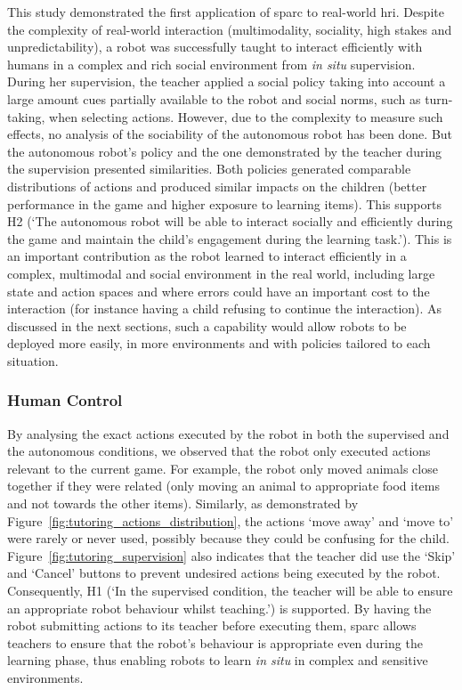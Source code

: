 This study demonstrated the first application of \gls{sparc} to real-world \gls{hri}. Despite the complexity of real-world interaction (multimodality, sociality, high stakes and unpredictability), a robot was successfully taught to interact efficiently with humans in a complex and rich social environment from \textit{in situ} supervision. During her supervision, the teacher applied a social policy taking into account a large amount cues partially available to the robot and social norms, such as turn-taking, when selecting actions. However, due to the complexity to measure such effects, no analysis of the sociability of the autonomous robot has been done. But the autonomous robot's policy and the one demonstrated by the teacher during the supervision presented similarities. Both policies generated comparable distributions of actions and produced similar impacts on the children (better performance in the game and higher exposure to learning items). 
This supports H2 (`The autonomous robot will be able to interact socially and efficiently during the game and maintain the child's engagement during the learning task.'). 
This is an important contribution as the robot learned to interact efficiently in a complex, multimodal and social environment in the real world, including large state and action spaces and where errors could have an important cost to the interaction (for instance having a child refusing to continue the interaction). As discussed in the next sections, such a capability would allow robots to be deployed more easily, in more environments and with policies tailored to each situation.

\subsubsection{Human Control} \label{sec:tuto_control}

By analysing the exact actions executed by the robot in both the supervised and the autonomous conditions, we observed that the robot only executed actions relevant to the current game. For example, the robot only moved animals close together if they were related (only moving an animal to appropriate food items and not towards the other items). Similarly, as demonstrated by Figure~\ref{fig:tutoring_actions_distribution}, the actions `move away' and `move to' were rarely or never used, possibly because they could be confusing for the child. Figure~\ref{fig:tutoring_supervision} also indicates that the teacher did use the `Skip' and `Cancel' buttons to prevent undesired actions being executed by the robot. Consequently, H1 (`In the supervised condition, the teacher will be able to ensure an appropriate robot behaviour whilst teaching.') is supported. By having the robot submitting actions to its teacher before executing them, \gls{sparc} allows teachers to ensure that the robot's behaviour is appropriate even during the learning phase, thus enabling robots to learn \emph{in situ} in complex and sensitive environments.

